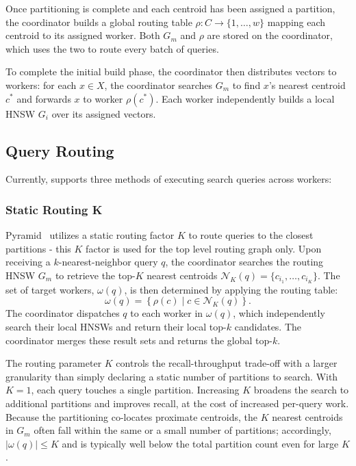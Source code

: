 \documentclass[sigconf,review,anonymous]{acmart}
\begin{document}
    Once partitioning is complete and each centroid has been assigned a partition, the coordinator builds a global routing table $\rho: C \rightarrow \{1, \ldots, w\}$ mapping each centroid to its assigned worker. Both $G_m$ and $\rho$ are stored on the coordinator, which uses the two to route every batch of queries.
    
    To complete the initial build phase, the coordinator then distributes vectors to workers: for each $x \in X$, the coordinator searches $G_m$ to find $x$'s nearest centroid $c^*$ and forwards $x$ to worker $\rho(c^*)$. Each worker independently builds a local HNSW $G_i$ over its assigned vectors.
    
\subsection{Query Routing}
    Currently, \SystemName{} supports three methods of executing search queries across workers: 

\subsubsection{Static Routing K}
    Pyramid~\cite{deng2019pyramid} utilizes a static routing factor $K$ to route queries to the closest partitions - this $K$ factor is used for the top level routing graph only. Upon receiving a $k$-nearest-neighbor query $q$, the coordinator searches the routing HNSW $G_m$ to retrieve the top-$K$ nearest centroids $\mathcal{N}_K(q) = \{c_{i_1}, \ldots, c_{i_K}\}$. The set of target workers, $\omega(q)$,  is then determined by applying the routing table:
    \[
      \omega(q) = \left\{ \rho(c) \mid c \in \mathcal{N}_K(q) \right\}.
    \]
    The coordinator dispatches $q$ to each worker in $\omega(q)$, which independently search their local HNSWs and return their local top-$k$ candidates. The coordinator merges these result sets and returns the global top-$k$.

    The routing parameter $K$ controls the recall-throughput trade-off with a larger granularity than simply declaring a static number of partitions to search. With $K = 1$, each query touches a single partition. Increasing $K$ broadens the search to additional partitions and improves recall, at the cost of increased per-query work. Because the partitioning co-locates proximate centroids, the $K$ nearest centroids in $G_m$ often fall within the same or a small number of partitions; accordingly, $|\omega(q)| \leq K$ and is typically well below the total partition count even for large $K$ \cite{deng2019pyramid}.
\end{document}
